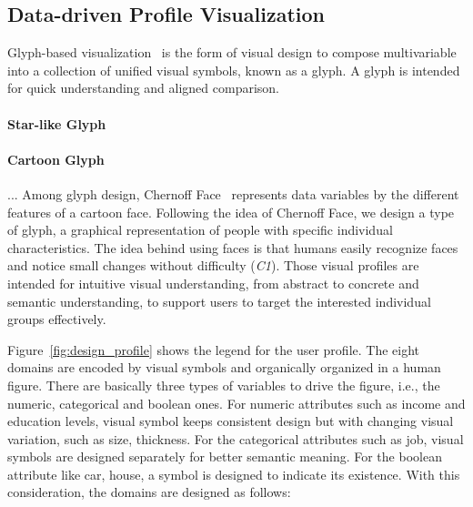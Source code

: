 

\subsection{Data-driven Profile Visualization}

Glyph-based visualization~\cite{borgo2013glyph} is the form of visual design to compose multivariable into a collection of unified visual symbols, known as a glyph. A glyph is intended for quick understanding and aligned comparison. 

\paragraph{Star-like Glyph} 


\paragraph{Cartoon Glyph} ... Among glyph design, Chernoff Face~\cite{chernoff1973use} represents data variables by the different features of a cartoon face. Following the idea of Chernoff Face, we design a type of glyph, a graphical representation of people with specific individual characteristics. The idea behind using faces is that humans easily recognize faces and notice small changes without difficulty (\textit{C1}). Those visual profiles are intended for intuitive visual understanding, from abstract to concrete and semantic understanding, to support users to target the interested individual groups effectively.

Figure~\ref{fig:design_profile} shows the legend for the user profile. The eight domains are encoded by visual symbols and organically organized in a human figure. There are basically three types of variables to drive the figure, i.e., the numeric, categorical and boolean ones. For numeric attributes such as income and education levels, visual symbol keeps consistent design but with changing visual variation, such as size, thickness. For the categorical attributes such as job, visual symbols are designed separately for better semantic meaning. For the boolean attribute like car, house, a symbol is designed to indicate its existence. With this consideration, the domains are designed as follows:

